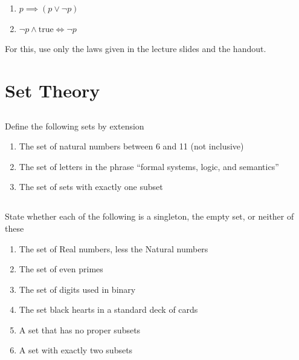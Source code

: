 \documentclass[twocolumn]{article}
\begin{document}
\begin{enumerate}
    \item $p \implies (p \vee \neg p)$
    \item $\neg p \wedge \text{true} \Longleftrightarrow \neg p$
\end{enumerate}

For this, use only the laws given in the lecture slides and the handout.


\clearpage
\section{Set Theory}

\subsection{}

    Define the following sets by extension

    \begin{enumerate}
        \item The set of natural numbers between 6 and 11 (not inclusive)
        \item The set of letters in the phrase ``formal systems, logic, and semantics''
        \item The set of sets with exactly one subset
    \end{enumerate}

\subsection{}

    State whether each of the following is a singleton, the empty set, or neither of these

    \begin{enumerate}
        \item The set of Real numbers, less the Natural numbers
        \item The set of even primes
        \item The set of digits used in binary
        \item The set black hearts in a standard deck of cards
        \item A set that has no proper subsets
        \item A set with exactly two subsets
    \end{enumerate}

\subsection{}
\end{document}
